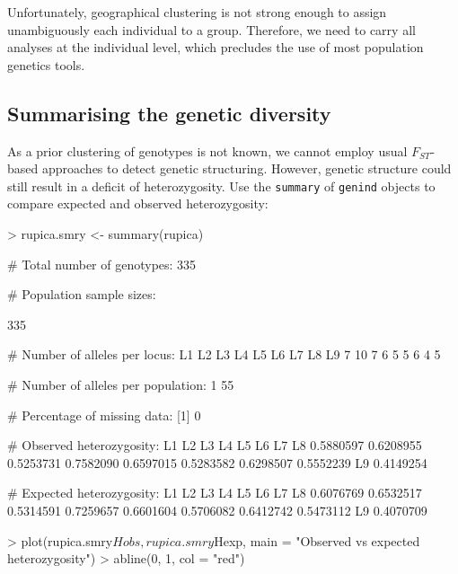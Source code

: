 \documentclass{article}
\begin{document}
Unfortunately, geographical clustering is not strong enough to assign unambiguously each individual to a group.
Therefore, we need to carry all analyses at the individual level, which precludes the use of most
population genetics tools.




\subsection{Summarising the genetic diversity}
As a prior clustering of genotypes is not known, we cannot employ usual
$F_{ST}$-based approaches to detect genetic structuring.
However, genetic structure could still result in a deficit of
heterozygosity.
Use the \texttt{summary} of \texttt{genind} objects to compare expected and
observed heterozygosity:
\begin{Schunk}
\begin{Sinput}
> rupica.smry <- summary(rupica)
\end{Sinput}
\begin{Soutput}
 # Total number of genotypes:  335 

 # Population sample sizes:  
    
335 

 # Number of alleles per locus:  
L1 L2 L3 L4 L5 L6 L7 L8 L9 
 7 10  7  6  5  5  6  4  5 

 # Number of alleles per population:  
 1 
55 

 # Percentage of missing data:  
[1] 0

 # Observed heterozygosity:  
       L1        L2        L3        L4        L5        L6        L7        L8 
0.5880597 0.6208955 0.5253731 0.7582090 0.6597015 0.5283582 0.6298507 0.5552239 
       L9 
0.4149254 

 # Expected heterozygosity:  
       L1        L2        L3        L4        L5        L6        L7        L8 
0.6076769 0.6532517 0.5314591 0.7259657 0.6601604 0.5706082 0.6412742 0.5473112 
       L9 
0.4070709 
\end{Soutput}
\begin{Sinput}
> plot(rupica.smry$Hobs, rupica.smry$Hexp, main = "Observed vs expected heterozygosity")
> abline(0, 1, col = "red")
\end{Sinput}
\end{Schunk}
\end{document}
